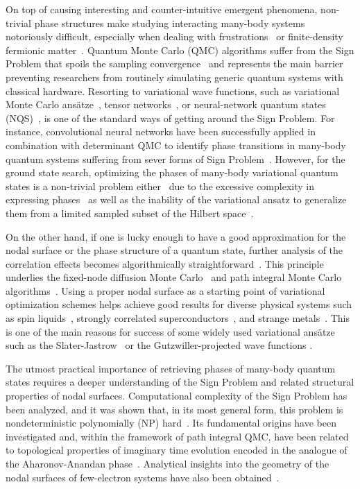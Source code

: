 On top of causing interesting and counter-intuitive emergent phenomena, non-trivial phase structures make studying interacting many-body systems notoriously difficult, especially when dealing with frustrations~\cite{frustrations} or finite-density fermionic matter~\cite{finite_density}. Quantum Monte Carlo (QMC) algorithms suffer from the Sign Problem that spoils the sampling convergence~\cite{sign_problem} and represents the main barrier preventing researchers from routinely simulating generic quantum systems with classical hardware. Resorting to variational wave functions, such as variational Monte Carlo ans\"atze~\cite{vmc}, tensor networks~\cite{Orus}, or neural-network quantum states (NQS)~\cite{Carleo}, is one of the standard ways of getting around the Sign Problem. For instance, convolutional neural networks have been successfully applied in combination with determinant QMC to identify phase transitions in many-body quantum systems suffering from sever forms of Sign Problem~\cite{Trebst}. However, for the ground state search, optimizing the phases of many-body variational quantum states is a non-trivial problem either~\cite{sign_generalization,Szabo_2020_Neural_network} due to the excessive complexity in expressing phases~\cite{kastoryano} as well as the inability of the variational ansatz to generalize them from a limited sampled subset of the Hilbert space~\cite{sign_generalization}. 

On the other hand, if one is lucky enough to have a good approximation for the nodal surface or the phase structure of a quantum state, further analysis of the correlation effects becomes algorithmically straightforward~\cite{Ceperley}. This principle underlies the fixed-node diffusion Monte Carlo~\cite{fixed_node} and path integral Monte Carlo algorithms~\cite{Ceperley_path}. Using a proper nodal surface as a starting point of variational optimization schemes helps achieve good results for diverse physical systems such as spin liquids~\cite{spin_liquids, astrakhantsev2021}, strongly correlated superconductors~\cite{Imada_SC}, and strange metals~\cite{strange_metals}. This is one of the main reasons for success of some widely used variational ans\"atze such as the Slater-Jastrow~\cite{Slater_Jastrow_1, Slater_Jastrow_2} or the Gutzwiller-projected wave functions \cite{Gutzwiller, Nomura, ferrari2019neural}.

The utmost practical importance of retrieving phases of many-body quantum states requires a deeper understanding of the Sign Problem and related structural properties of nodal surfaces. Computational complexity of the Sign Problem has been analyzed, and it was shown that, in its most general form, this problem is nondeterministic polynomially (NP) hard~\cite{NP_Troyer}. Its fundamental origins have been investigated and, within the framework of path integral QMC, have been related to topological properties of imaginary time evolution encoded in the analogue of the Aharonov-Anandan phase~\cite{Soluyanov}. Analytical insights into the geometry of the nodal surfaces of few-electron systems have also been obtained~\cite{nodal1, nodal2}.

